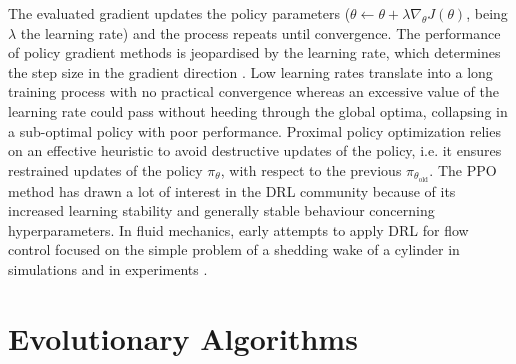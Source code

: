 The evaluated gradient updates the policy parameters ($\theta \leftarrow \theta + \lambda  \nabla_\theta J(\theta)$, being $\lambda$ the learning rate) and the process repeats until convergence. The performance of policy gradient methods is jeopardised by the learning rate, which determines the step size in the gradient direction \citep{Viquerat2021RLrev}. Low learning rates translate into a long training process with no practical convergence whereas an excessive value of the learning rate could pass without heeding through the global optima, collapsing in a sub-optimal policy with poor performance. Proximal policy optimization \citep[PPO,][]{schulman_proximal_2017} relies on an effective heuristic to avoid destructive updates of the policy, i.e. it ensures restrained updates of the policy $\pi_\theta$, with respect to the previous $\pi_{\theta_{\text{old}}}$. The PPO method has drawn a lot of interest in the DRL community because of its increased learning stability and generally stable behaviour concerning hyperparameters. In fluid mechanics, early attempts to apply DRL for flow control focused on the simple problem of a shedding wake of a cylinder in simulations \citep{rabault2019JFM} and in experiments \citep{Fan2020}.

\section{Evolutionary Algorithms}

